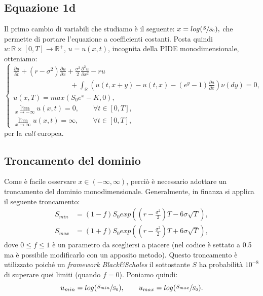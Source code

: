 \documentclass[a4paper,10pt]{report}
\newcommand{\der}[2]{\frac{\partial #1}{\partial #2}}
\newcommand{\dder}[2]{\frac{\partial^2 #1}{\partial #2^2}}
\theoremstyle{osservazione}
\theoremstyle{esempio}
\theoremstyle{notazione}
\theoremstyle{corollario}
\begin{document}
\subsection{Equazione 1d}
Il primo cambio di variabili che studiamo \`e il seguente: $x=log(\sfrac{S}{S_0}),$ che permette di portare l'equazione a coefficienti costanti. Posta quindi $u: \mathbb{R}\times[0,T]\rightarrow\mathbb{R}^+$, $u=u(x,t)$, incognita della PIDE monodimensionale, otteniamo:
\begin{equation}
\begin{cases}
\displaystyle
\der{u}{t}+\left(r-\sigma^2\right)\der{u}{x}+\frac{\sigma^2}{2}\dder{u}{x}-ru\\
\displaystyle
\qquad\qquad\qquad\qquad+\int_\mathbb{R}\left( u(t,x+y)-u(t,x)-(e^y-1)\der{u}{x}\right)\nu(dy)=0,\\
u(x,T)=max(S_0e^x-K,0),\\
\lim\limits_{x\to-\infty}u(x,t)=0,\qquad\forall t\in[0,T],\\
\lim\limits_{x\to\infty}u(x,t)=\infty,\qquad\forall t\in[0,T],
\end{cases}
\end{equation}
per la \emph{call} europea.
\subsection{Troncamento del dominio}
Come \`e facile osservare $x\in(-\infty,\infty)$, perci\`o \`e necessario adottare un troncamento del dominio monodimensionale. Generalmente, in finanza si applica il seguente troncamento:
\begin{align*}
S_{min}&=(1-f)S_0exp\left( \left(r-\frac{\sigma^2}{2}\right)T-6\sigma\sqrt{T}\right),\\
S_{max}&=(1+f)S_0exp\left( \left(r-\frac{\sigma^2}{2}\right)T+6\sigma\sqrt{T}\right),
\end{align*}
dove $0\leq f\leq1$ \`e un parametro da scegliersi a piacere (nel codice \`e settato a 0.5 ma \`e possibile modificarlo con un apposito metodo). Questo troncamento \`e utilizzato poich\'e un \emph{framework Black\&Scholes} il sottostante $S$ ha probabilit\`a $10^{-8}$ di superare quei limiti (quando $f=0$). Poniamo quindi: $$u_{min}=log(\sfrac{S_{min}}{S_0}), \qquad u_{max}=log(\sfrac{S_{max}}{S_0}).$$
\end{document}
